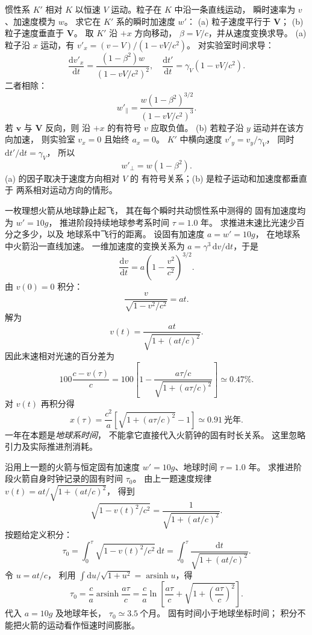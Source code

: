 惯性系 $K'$ 相对 $K$ 以恒速 $V$
运动。粒子在 $K$ 中沿一条直线运动，
瞬时速率为 $v$、加速度模为 $w$。
求它在 $K'$ 系的瞬时加速度 $w'$：
(a) 粒子速度平行于 $\bm V$；
(b) 粒子速度垂直于 $\bm V$。
\exsolution
取 $K'$ 沿 $+x$ 方向移动，
$\beta=V/c$，并从速度变换求导。
(a) 粒子沿 $x$ 运动，有
$v'_x=(v-V)/(1-vV/c^2)$。
对实验室时间求导：
\[
\frac{\mathrm dv'_x}{\mathrm dt}
=\frac{(1-\beta^2)w}{(1-vV/c^2)^2},
\quad
\frac{\mathrm dt'}{\mathrm dt}
=\gamma_V(1-vV/c^2).
\]
二者相除：
\[
\boxed{w'_\parallel=
\frac{w(1-\beta^2)^{3/2}}
{(1-vV/c^2)^3}}.
\]
若 $\bm v$ 与 $\bm V$ 反向，则
沿 $+x$ 的有符号 $v$ 应取负值。
(b) 若粒子沿 $y$ 运动并在该方向加速，
则实验室 $v_x=0$ 且始终 $a_x=0$。
$K'$ 中横向速度 $v'_y=v_y/\gamma_V$，
同时 $\mathrm dt'/\mathrm dt=\gamma_V$，
所以
\[
\boxed{w'_\perp=w(1-\beta^2)}.
\]
\excheck (a) 的因子取决于速度方向相对 $V$ 的
有符号关系；(b) 是粒子运动和加速度都垂直于
两系相对运动方向的情形。

一枚理想火箭从地球静止起飞，
其在每个瞬时共动惯性系中测得的
固有加速度均为 $w'=10g$，
推进阶段持续地球参考系时间
$\tau=1.0$ 年。
求推进末速比光速少百分之多少，以及
地球系中飞行的距离。
\exsolution
设固有加速度 $a=w'=10g$，
在地球系中火箭沿一直线加速。
一维加速度的变换关系为
$a=\gamma^3\,\mathrm dv/\mathrm dt$，于是
\[
\frac{\mathrm dv}{\mathrm dt}
=a\left(1-\frac{v^2}{c^2}\right)^{3/2}.
\]
由 $v(0)=0$ 积分：
\[
\frac{v}{\sqrt{1-v^2/c^2}}=at.
\]
解为
\[
\boxed{v(t)=\frac{at}{\sqrt{1+(at/c)^2}}}.
\]
因此末速相对光速的百分差为
\[
\boxed{100\frac{c-v(\tau)}c
=100\left[1-\frac{a\tau/c}{\sqrt{1+(a\tau/c)^2}}\right]
\simeq0.47\%}.
\]
对 $v(t)$ 再积分得
\[
\boxed{x(\tau)=\frac{c^2}{a}
\left[\sqrt{1+(a\tau/c)^2}-1\right]
\simeq0.91\ \text{光年}}.
\]
\excheck 一年在本题是\emph{地球系时间}，
不能拿它直接代入火箭钟的固有时长关系。
这里忽略引力及实际推进剂消耗。

沿用上一题的火箭与恒定固有加速度
$w'=10g$、地球时间 $\tau=1.0$ 年。
求推进阶段火箭自身时钟记录的固有时间
$\tau_0$。
\exsolution
由上一题速度规律
$v(t)=at/\sqrt{1+(at/c)^2}$，
得到
\[
\sqrt{1-v(t)^2/c^2}
=\frac1{\sqrt{1+(at/c)^2}}.
\]
按题给定义积分：
\[
\tau_0=\int_0^\tau
\sqrt{1-v(t)^2/c^2}\,\mathrm dt
=\int_0^\tau\frac{\mathrm dt}
{\sqrt{1+(at/c)^2}}.
\]
令 $u=at/c$，
利用 $\int\mathrm du/\sqrt{1+u^2}
=\operatorname{arsinh}u$，得
\[
\boxed{\tau_0=\frac ca
\operatorname{arsinh}\frac{a\tau}{c}
=\frac ca\ln\left[
\frac{a\tau}{c}+
\sqrt{1+\left(\frac{a\tau}{c}\right)^2}\right]}.
\]
代入 $a=10g$ 及地球年长，
$\boxed{\tau_0\simeq3.5\ \text{个月}}$。
\excheck 固有时间小于地球坐标时间；
积分不能把火箭的运动看作恒速时间膨胀。

